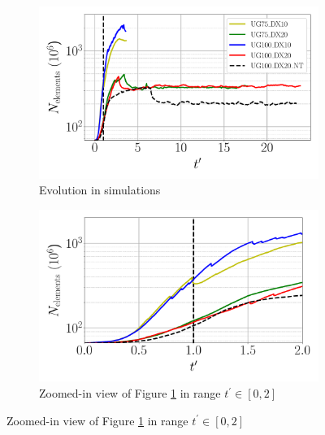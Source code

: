 \begin{figure}[ht]
\flushleft
\begin{subfigure}[b]{0.45\textwidth}
	\centering
   \includegraphics[scale=0.24]{./part2_developments/figures_ch5_resolved_JICF/JICF_nelem_evolution/JICF_nelem_increase}
   \vspace*{-0.25in}
   \caption{Evolution in simulations}
   \label{fig:JICF_nelem_increase_all_t} 
\end{subfigure}
\hfill
\begin{subfigure}[b]{0.45\textwidth}
	\centering
   \includegraphics[scale=0.24]{./part2_developments/figures_ch5_resolved_JICF/JICF_nelem_evolution/JICF_nelem_increase_t_in_0_2}
   \vspace*{-0.25in}
   \caption{Zoomed-in view of Figure \ref{fig:JICF_nelem_increase_all_t} in range $t^{\prime} \in [0, 2]$}
   \label{fig:JICF_nelem_increase_t_0_to_2}
\end{subfigure}


\end{figure}
